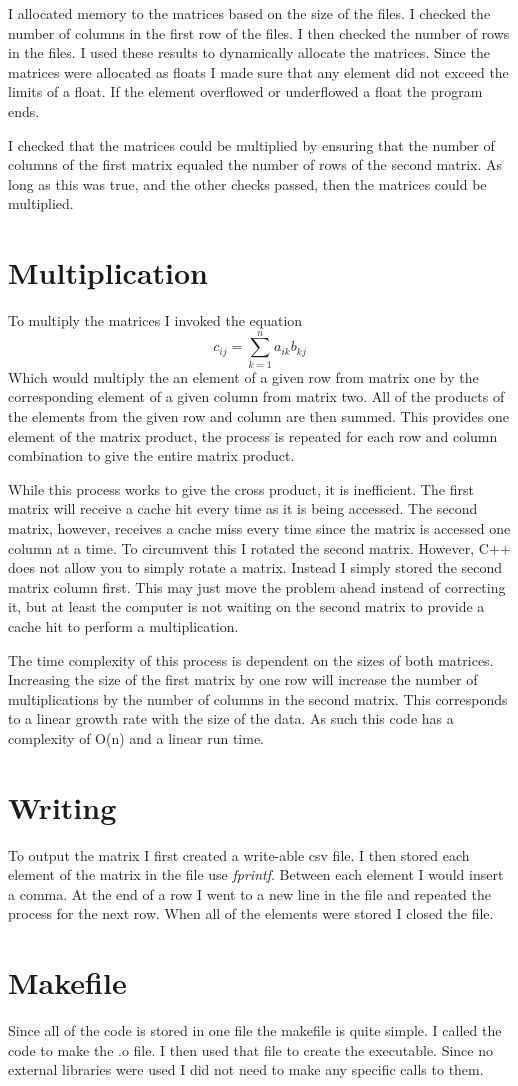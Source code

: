 \documentclass{article}
\begin{document}
I allocated memory to the matrices based on the size of the files. I checked the number of columns in the first row of the files. I then checked the number of rows in the files. I used these results to dynamically allocate the matrices. Since the matrices were allocated as floats I made sure that any element did not exceed the limits of a float. If the element overflowed or underflowed a float the program ends.

I checked that the matrices could be multiplied by ensuring that the number of columns of the first matrix equaled the number of rows of the second matrix. As long as this was true, and the other checks passed, then the matrices could be multiplied.

\section{Multiplication}
To multiply the matrices I invoked the equation 
\begin{equation}
    c_{ij} = \sum_{k = 1}^{n} a_{ik}b_{kj}
\end{equation}
Which would multiply the an element of a given row from matrix one by the corresponding element of a given column from matrix two. All of the products of the elements from the given row and column are then summed. This provides one element of the matrix product, the process is repeated for each row and column combination to give the entire matrix product.

While this process works to give the cross product, it is inefficient. The first matrix will receive a cache hit every time as it is being accessed. The second matrix, however, receives a cache miss every time since the matrix is accessed one column at a time. To circumvent this I rotated the second matrix. However, C++ does not allow you to simply rotate a matrix. Instead I simply stored the second matrix column first. This may just move the problem ahead instead of correcting it, but at least the computer is not waiting on the second matrix to provide a cache hit to perform a multiplication.

The time complexity of this process is dependent on the sizes of both matrices. Increasing the size of the first matrix by one row will increase the number of multiplications by the number of columns in the second matrix. This corresponds to a linear growth rate with the size of the data. As such this code has a complexity of O(n) and a linear run time.


\section{Writing}
To output the matrix I first created a write-able csv file. I then stored each element of the matrix in the file use \textit{fprintf}. Between each element I would insert a comma. At the end of a row I went to a new line in the file and repeated the process for the next row. When all of the elements were stored I closed the file.

\section{Makefile}
Since all of the code is stored in one file the makefile is quite simple. I called the code to make the .o file. I then used that file to create the executable. Since no external libraries were used I did not need to make any specific calls to them.
\end{document}
